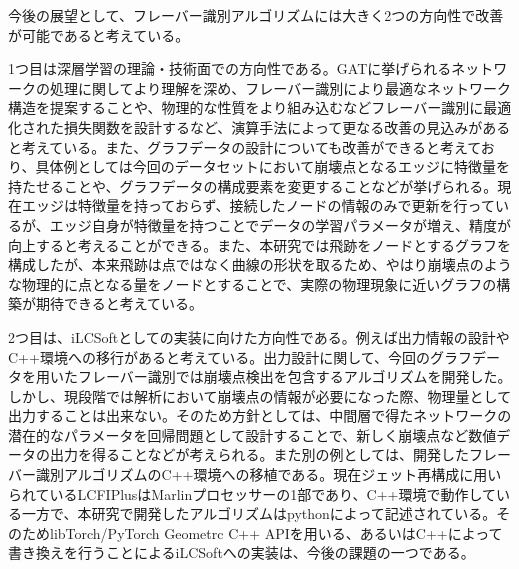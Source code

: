 今後の展望として、フレーバー識別アルゴリズムには大きく2つの方向性で改善が可能であると考えている。

1つ目は深層学習の理論・技術面での方向性である。GATに挙げられるネットワークの処理に関してより理解を深め、フレーバー識別により最適なネットワーク構造を提案することや、物理的な性質をより組み込むなどフレーバー識別に最適化された損失関数を設計するなど、演算手法によって更なる改善の見込みがあると考えている。また、グラフデータの設計についても改善ができると考えており、具体例としては今回のデータセットにおいて崩壊点となるエッジに特徴量を持たせることや、グラフデータの構成要素を変更することなどが挙げられる。現在エッジは特徴量を持っておらず、接続したノードの情報のみで更新を行っているが、エッジ自身が特徴量を持つことでデータの学習パラメータが増え、精度が向上すると考えることができる。また、本研究では飛跡をノードとするグラフを構成したが、本来飛跡は点ではなく曲線の形状を取るため、やはり崩壊点のような物理的に点となる量をノードとすることで、実際の物理現象に近いグラフの構築が期待できると考えている。

2つ目は、iLCSoftとしての実装に向けた方向性である。例えば出力情報の設計やC++環境への移行があると考えている。出力設計に関して、今回のグラフデータを用いたフレーバー識別では崩壊点検出を包含するアルゴリズムを開発した。しかし、現段階では解析において崩壊点の情報が必要になった際、物理量として出力することは出来ない。そのため方針としては、中間層で得たネットワークの潜在的なパラメータを回帰問題として設計することで、新しく崩壊点など数値データの出力を得ることなどが考えられる。また別の例としては、開発したフレーバー識別アルゴリズムのC++環境への移植である。現在ジェット再構成に用いられているLCFIPlusはMarlinプロセッサーの1部であり、C++環境で動作している一方で、本研究で開発したアルゴリズムはpythonによって記述されている。そのためlibTorch/PyTorch Geometrc C++ APIを用いる、あるいはC++によって書き換えを行うことによるiLCSoftへの実装は、今後の課題の一つである。